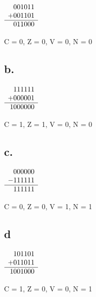 \documentclass[letterpaper,12pt,titlepage]{article}
\begin{document}
$\begin{array}[t]{r}
   001011 \\
  +001101 \\\hline
   011000 \\
\end{array}$

\begin{mdframed}[style=MyFrame]
C = 0,
Z = 0,
V = 0,
N = 0
\end{mdframed}

\subsection*{b.}

$\begin{array}[t]{r}
   111111 \\
  +000001 \\\hline
  1000000 \\
\end{array}$

\begin{mdframed}[style=MyFrame]
C = 1,
Z = 1,
V = 0,
N = 0
\end{mdframed}

\subsection*{c.}

$\begin{array}[t]{r}
   000000 \\
  -111111 \\\hline
   111111 \\
\end{array}$

\begin{mdframed}[style=MyFrame]
C = 0,
Z = 0,
V = 1,
N = 1
\end{mdframed}

\subsection*{d}

$\begin{array}[t]{r}
   101101 \\
  +011011 \\\hline
  1001000 \\
\end{array}$

\begin{mdframed}[style=MyFrame]
C = 1,
Z = 0,
V = 0,
N = 1
\end{mdframed}
\end{document}
